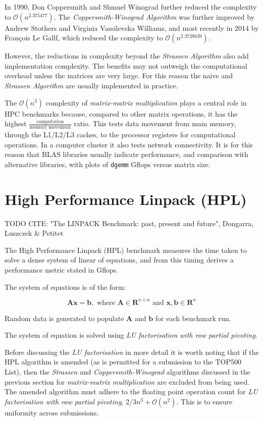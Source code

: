 In 1990, Don Coppersmith and Shmuel Winograd further reduced the complexity to $\mathcal{O}(n^{2.375477})$. The \emph{Coppersmith-Winograd Algorithm} was further improved by Andrew Stothers and Virginia Vassilevska Williams, and most recently in 2014 by François Le Gallf, which reduced the complexity to $\mathcal {O}(n^{2.3728639})$.

However, the reductions in complexity beyond the \emph{Strassen Algorithm} also add implementation complexity. The benefits may not outweigh the computational overhead unless the matrices are very large. For this reason the naive and \emph{Strassen Algorithm} are usually implemented in practice.    

The $\mathcal{O}(n^3)$ complexity of \emph{matrix-matrix multiplication} plays a central role in HPC benchmarks because, compared to other matrix operations, it has the highest $\frac{\text{computation}}{\text{memory movement}}$ ratio. This tests data movement from main memory, through the L1/L2/L3 caches, to the processor registers for computational operations. In a computer cluster it also tests network connectivity. It is for this reason that BLAS libraries usually indicate performance, and comparison with alternative libraries, with plots of \verb|dgemm| Gflops versus matrix size.


%
%
\section{High Performance Linpack (HPL)}

TODO CITE: "The LINPACK Benchmark: past, present and future", Dongarra, Luszczek \& Petitet

The High Performance Linpack (HPL) benchmark measures the time taken to solve a dense system of linear of equations, and from this timing derives a performance metric stated in Gflops. 

The system of equations is of the form:

\begin{equation}
\mathbf{Ax} = \mathbf{b},\text{ where }\mathbf{A} \in \mathbf{R}^{n\times n}\text{ and }\mathbf{x}, \mathbf{b} \in \mathbf{R}^n
\end{equation} 

Random data is generated to populate $\mathbf{A}$ and $\mathbf{b}$ for each benchmark run.

The system of equation is solved using \emph{LU factorisation with row partial pivoting}.

Before discussing the \emph{LU factorisation} in more detail it is worth noting that if the HPL algorithm is amended (as is permitted for a submission to the TOP500 List), then the \emph{Strassen} and \emph{Coppersmith-Winograd} algorithms discussed in the previous section for \emph{matrix-matrix multiplication} are excluded from being used. The amended algorithm must adhere to the floating point operation count for \emph{LU factorisation with row partial pivoting}, $2/3n^3 + \mathcal{O}(n^2)$. This is to ensure uniformity across submissions. 

